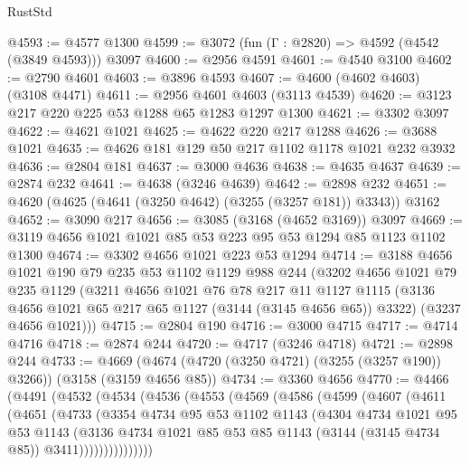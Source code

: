 \begin{lexlean}{RustStd}
\begin{coremodule}
{\begin{coremodule}
{{{{{{{{{{{{{{{{{{{{{{{{{{@4593 := @4577 @1300
@4599 := @3072 (fun (Γ : @2820) => @4592 (@4542 (@3849 @4593))) @3097
@4600 := @2956 @4591
@4601 := @4540 @3100
@4602 := @2790 @4601
@4603 := @3896 @4593
@4607 := @4600 (@4602 @4603) (@3108 @4471)
@4611 := @2956 @4601 @4603 (@3113 @4539)
@4620 := @3123 @217 @220 @225 @53 @1288 @65 @1283 @1297 @1300
@4621 := @3302 @3097
@4622 := @4621 @1021
@4625 := @4622 @220 @217 @1288
@4626 := @3688 @1021
@4635 := @4626 @181 @129 @50 @217 @1102 @1178 @1021 @232 @3932
@4636 := @2804 @181
@4637 := @3000 @4636
@4638 := @4635 @4637
@4639 := @2874 @232
@4641 := @4638 (@3246 @4639)
@4642 := @2898 @232
@4651 := @4620 (@4625 (@4641 (@3250 @4642) (@3255 (@3257 @181)) @3343)) @3162
@4652 := @3090 @217
@4656 := @3085 (@3168 (@4652 @3169)) @3097
@4669 := @3119 @4656 @1021 @1021 @85 @53 @223 @95 @53 @1294 @85 @1123 @1102 @1300
@4674 := @3302 @4656 @1021 @223 @53 @1294
@4714 := @3188
    @4656
    @1021
    @190
    @79
    @235
    @53
    @1102
    @1129
    @988
    @244
    (@3202
      @4656
      @1021
      @79
      @235
      @1129
      (@3211
        @4656
        @1021
        @76
        @78
        @217
        @11
        @1127
        @1115
        (@3136 @4656 @1021 @65 @217 @65 @1127 (@3144 (@3145 @4656 @65)) @3322)
        (@3237 @4656 @1021)))
@4715 := @2804 @190
@4716 := @3000 @4715
@4717 := @4714 @4716
@4718 := @2874 @244
@4720 := @4717 (@3246 @4718)
@4721 := @2898 @244
@4733 := @4669 (@4674 (@4720 (@3250 @4721) (@3255 (@3257 @190)) @3266)) (@3158 (@3159 @4656 @85))
@4734 := @3360 @4656
@4770 := @4466
    (@4491
      (@4532
        (@4534
          (@4536
            (@4553
              (@4569
                (@4586
                  (@4599
                    (@4607
                      (@4611
                        (@4651
                          (@4733
                            (@3354
                              @4734
                              @95
                              @53
                              @1102
                              @1143
                              (@4304
                                @4734
                                @1021
                                @95
                                @53
                                @1143
                                (@3136
                                  @4734
                                  @1021
                                  @85
                                  @53
                                  @85
                                  @1143
                                  (@3144 (@3145 @4734 @85))
                                  @3411)))))))))))))))
}}}}}}}}}}}}}}}}}}}}}}}}}}
\end{coremodule}}
\end{coremodule}
\end{lexlean}
